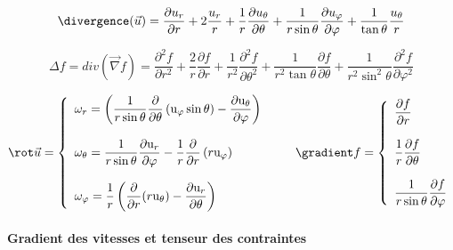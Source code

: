 $$
\divergence(\vec{u})=\frac{\partial u_r}{\partial r} + 2 \frac{u_r}{r} + \frac{1}{r} \frac{\partial u_\theta}{\partial \theta} + \frac{1}{r \sin \theta} \frac{\partial u_\varphi}{\partial \varphi} + \frac{1}{\tan \theta} \frac{u_\theta}{r} 
$$

$$\Delta f=div \left( \vec{\nabla} f \right)=\frac{\partial^2 f}{\partial r^2} + \frac{2}{r} \frac{\partial f}{\partial r} + \frac{1}{r^2} \frac{\partial^2 f}{\partial \theta^2} + \frac{1}{r^2 \tan \theta} \frac{\partial f}{\partial \theta} + \frac{1}{r^2 \sin^2 \theta} \frac{\partial^2 f}{\partial \varphi^2} $$


$$ 
\rot \vec{u} =  \left\{ 
\begin{array}{l} 
\displaystyle \omega_r = \left(\frac{1}{r \sin \theta}\frac{\partial}{\partial \theta} \left( \mathrm{u}_\varphi \sin \theta \right) - \frac{\partial \mathrm{u}_\theta}{\partial \varphi}\right) \\ \\
\displaystyle \omega_\theta = \frac{1}{r \sin \theta} \frac{\partial \mathrm{u}_r}{\partial \varphi} - \frac{1}{r} \frac{\partial}{\partial r}\left( r  \mathrm{u}_\varphi \right) 
\\ \\
\displaystyle \omega_\varphi = \frac{1}{r}\left(\frac{\partial}{\partial r}(r \mathrm{u}_\theta) - \frac{\partial \mathrm{u}_r}{\partial \theta}\right)\\
\end{array}
\right.
\qquad 
\gradient f =  \left\{ 
\begin{array}{l} 
\displaystyle \frac{\partial f}{\partial r} 
 \\ \\
\displaystyle \frac{1}{r} \frac{\partial f}{\partial \theta} 
\\ \\
\displaystyle \frac{1}{r \sin \theta} \frac{\partial f}{\partial \varphi }\\
\end{array}
\right.
$$




\paragraph{Gradient des vitesses et tenseur des contraintes}


